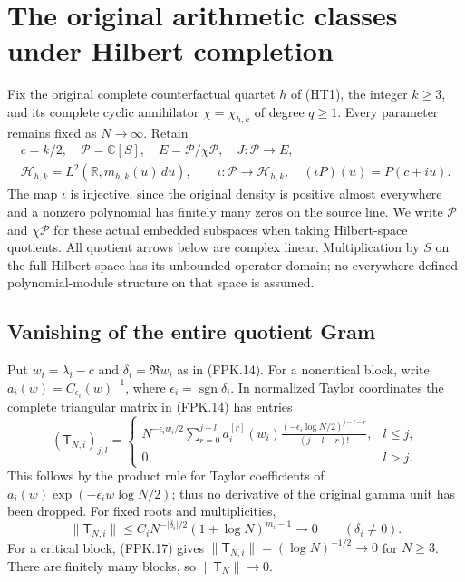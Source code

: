 \section{The original arithmetic classes under Hilbert completion}
\label{CFStage:sec:fixed-packet-hilbert-geometry}

Fix the original complete counterfactual quartet $h$ of (HT1), the
integer $k\geq3$, and its complete cyclic annihilator
$\chi=\chi_{h,k}$ of degree $q\geq1$.
Every parameter remains fixed as $N\to\infty$. Retain
\[
 \begin{gathered}
 c=k/2,\quad \mathcal P=\mathbb C[S],\quad
 E=\mathcal P/\chi\mathcal P,\quad J:\mathcal P\longrightarrow E,\\
 \mathscr H_{h,k}=L^2(\mathbb R,m_{h,k}(u)\,du),\qquad
 \iota:\mathcal P\longrightarrow\mathscr H_{h,k},\quad
             (\iota P)(u)=P(c+iu).
 \end{gathered}
 \tag{FKG.1}
\]
The map $\iota$ is injective, since the original density is positive
almost everywhere and a nonzero polynomial has finitely many zeros
on the source line. We write $\mathcal P$ and $\chi\mathcal P$ for
these actual embedded subspaces when taking Hilbert-space quotients.
All quotient arrows below are complex linear. Multiplication by $S$
on the full Hilbert space has its unbounded-operator domain; no
everywhere-defined polynomial-module structure on that space is assumed.

\subsection{Vanishing of the entire quotient Gram}

Put $w_i=\lambda_i-c$ and $\delta_i=\Re w_i$ as in (FPK.14).
For a noncritical block, write $a_i(w)=C_{\epsilon_i}(w)^{-1}$,
where $\epsilon_i=\operatorname{sgn}\delta_i$. In normalized Taylor
coordinates the complete triangular matrix in (FPK.14) has entries
\[
 (\mathsf T_{N,i})_{j,l}=
 \begin{cases}
 N^{-\epsilon_iw_i/2}
 \displaystyle\sum_{r=0}^{j-l}
       a_i^{[r]}(w_i)
       \frac{(-\epsilon_i\log N/2)^{j-l-r}}{(j-l-r)!},&l\leq j,\\
 0,&l>j.
 \end{cases}
 \tag{FKG.2}
\]
This follows by the product rule for Taylor coefficients of
$a_i(w)\exp(-\epsilon_i w\log N/2)$; thus no derivative of the
original gamma unit has been dropped. For fixed roots and multiplicities,
\[
 \|\mathsf T_{N,i}\|
 \leq C_i N^{-|\delta_i|/2}(1+\log N)^{m_i-1}
       \longrightarrow0\qquad(\delta_i\ne0).
 \tag{FKG.3}
\]
For a critical block, (FPK.17) gives
$\|\mathsf T_{N,i}\|=(\log N)^{-1/2}\to0$ for $N\geq3$.
There are finitely many blocks, so $\|\mathsf T_N\|\to0$.

